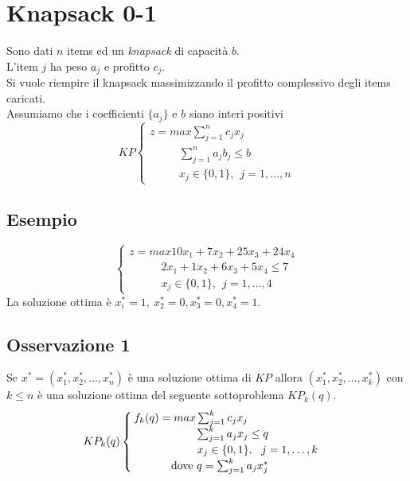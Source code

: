 \section{Knapsack 0-1}
Sono dati $n$ items ed un \textit{knapsack} di capacità $b$.\\
L'item $j$ ha peso $a_{j}$ e profitto $c_{j}$.\\
Si vuole riempire il knapsack massimizzando il profitto complessivo degli items caricati.\\
Assumiamo che i coefficienti $\{a_{j}\}$ e $b$ siano interi positivi
\begin{equation*}
	KP
	\begin{cases}
		z = max\sum_{j=1}^{n}c_{j}x_{j} \\
		\ \ \ \ \ \ \ \ \ \ \ \ \sum_{j=1}^{n}a_{j}b_{j}\le b \\
		\ \ \ \ \ \ \ \ \ \ \ \ x_{j}\in\{0,1\},\ \ j=1,\dots,n
	\end{cases}
\end{equation*}

\subsection{Esempio}
\begin{displaymath}
	\begin{cases}
		z=max 10x_{1}+7x_{2}+25x_{3}+24x_{4}\\
		\ \ \ \ \ \ \ \ \ \ \ \ \ 2x_{1}+1x_{2}+6x_{3}+5x_{4}\le 7 \\
		\ \ \ \ \ \ \ \ \ \ \ \ \ x_{j}\in\{0,1\},\ \ j=1,\dots,4
	\end{cases}
\end{displaymath}
La soluzione ottima è $x_{i}^{*}=1,\ x_{2}^{*}=0,x_{3}^{*}=0,x_{4}^{*}=1$.

\subsection{Osservazione 1}\label{ss:osservazione_1}
Se $x^{*}=(x_{1}^{*},x_{2}^{*},\dots,x_{n}^{*})$ è una soluzione ottima di $KP$ allora $(x_{1}^{*},x_{2}^{*},\dots,x_{k}^{*})$ con $k\le n$ è una soluzione ottima del seguente sottoproblema $KP_{k}(q)$.
\begin{equation*}
	KP_{k}(q)
	\begin{cases}
		f_{k}(q)=max\sum_{j=1}^{k}c_{j}x_{j}\\
		\ \ \ \ \ \ \ \ \ \ \ \ \ \ \ \ \ \sum_{j=1}^{k}a_{j}x_{j}\le q \\
		\ \ \ \ \ \ \ \ \ \ \ \ \ \ \ \ \ x_{j}\in\{0,1\},\ \ j=1,\dots,k \\
		\ \ \ \ \ \ \ \ \ \ \textnormal{dove }q=\sum_{j=1}^{k}a_{j}x_{j}^{*}
	\end{cases}
\end{equation*}
